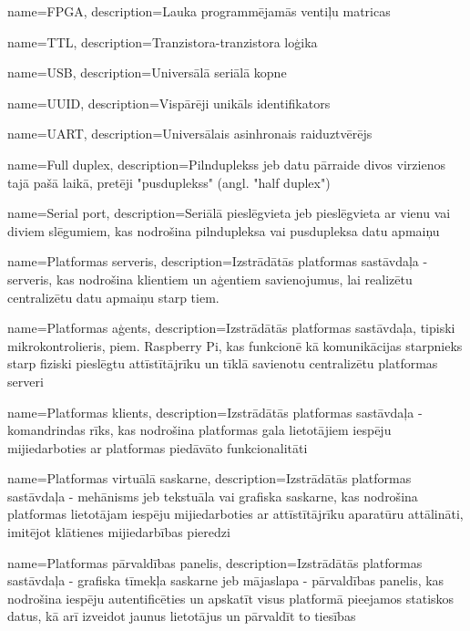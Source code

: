 \makeglossaries

{
    name=FPGA,
    description={Lauka programmējamās ventiļu matricas}
}

{
    name=TTL,
    description={Tranzistora-tranzistora loģika}
}

{
    name=USB,
    description={Universālā seriālā kopne}
}

{
    name=UUID,
    description={Vispārēji unikāls identifikators}
}

{
    name=UART,
    description={Universālais asinhronais raiduztvērējs}
}

{
    name=Full duplex,
    description={Pilnduplekss jeb datu pārraide divos virzienos tajā pašā laikā, pretēji "pusduplekss" (angl. "half duplex")}
}

{
    name=Serial port,
    description={Seriālā pieslēgvieta jeb pieslēgvieta ar vienu vai diviem slēgumiem, kas nodrošina pilndupleksa 
        vai pusdupleksa datu apmaiņu}
}

{
    name=Platformas serveris,
    description={Izstrādātās platformas sastāvdaļa - serveris, kas nodrošina klientiem un aģentiem savienojumus, 
        lai realizētu centralizētu datu apmaiņu starp tiem.}
}

{
    name=Platformas aģents,
    description={Izstrādātās platformas sastāvdaļa, tipiski mikrokontrolieris, piem. Raspberry Pi, kas 
        funkcionē kā komunikācijas starpnieks starp fiziski pieslēgtu attīstītājrīku un tīklā 
        savienotu centralizētu platformas serveri}
}

{
    name=Platformas klients,
    description={Izstrādātās platformas sastāvdaļa - komandrindas rīks, kas nodrošina platformas gala lietotājiem
        iespēju mijiedarboties ar platformas piedāvāto funkcionalitāti}
}

{
    name=Platformas virtuālā saskarne,
    description={Izstrādātās platformas sastāvdaļa - mehānisms jeb tekstuāla vai grafiska saskarne, kas nodrošina 
        platformas lietotājam iespēju mijiedarboties ar attīstītājrīku aparatūru attālināti, imitējot klātienes 
        mijiedarbības pieredzi}
}

{
    name=Platformas pārvaldības panelis,
    description={Izstrādātās platformas sastāvdaļa - grafiska tīmekļa saskarne jeb mājaslapa - pārvaldības panelis, 
        kas nodrošina iespēju autentificēties un apskatīt visus platformā pieejamos statiskos datus, kā arī izveidot
        jaunus lietotājus un pārvaldīt to tiesības}
}

